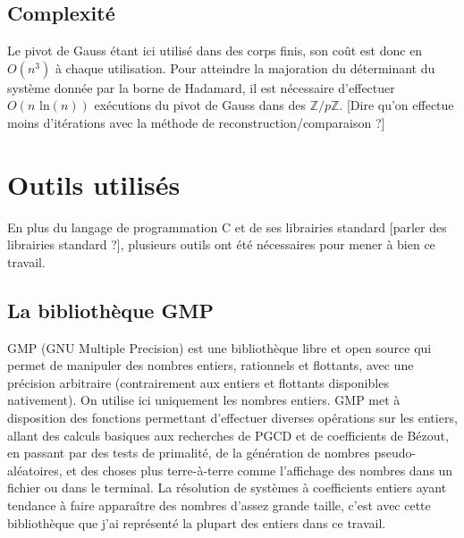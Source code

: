 \documentclass[french]{article}
\begin{document}
\subsection{Complexité} \label{subsec:modcompl}
Le pivot de Gauss étant ici utilisé dans des corps finis, son coût est donc en $O(n^3)$ à chaque utilisation.
Pour atteindre la majoration du déterminant du système donnée par la borne de Hadamard, il est nécessaire d'effectuer $O(n \mbox{ ln}(n))$ exécutions du pivot de Gauss dans des $\mathbb{Z}/p\mathbb{Z}$.
[Dire qu'on effectue moins d'itérations avec la méthode de reconstruction/comparaison ?]
\newline
[Total]
\section{Outils utilisés} \label{sec:outils}
En plus du langage de programmation C et de ses librairies standard [parler des librairies standard ?], plusieurs outils ont été nécessaires pour mener à bien ce travail.
\subsection{La bibliothèque GMP}
GMP (GNU Multiple Precision) est une bibliothèque libre et open source qui permet de manipuler des nombres entiers, rationnels et flottants, avec une précision arbitraire (contrairement aux entiers et flottants disponibles nativement). On utilise ici uniquement les nombres entiers. GMP met à disposition des fonctions permettant d'effectuer diverses opérations sur les entiers, allant des calculs basiques aux recherches de PGCD et de coefficients de Bézout, en passant par des tests de primalité, de la génération de nombres pseudo-aléatoires, et des choses plus terre-à-terre comme l'affichage des nombres dans un fichier ou dans le terminal. La résolution de systèmes à coefficients entiers ayant tendance à faire apparaître des nombres d'assez grande taille, c'est avec cette bibliothèque que j'ai représenté la plupart des entiers dans ce travail.
\end{document}
